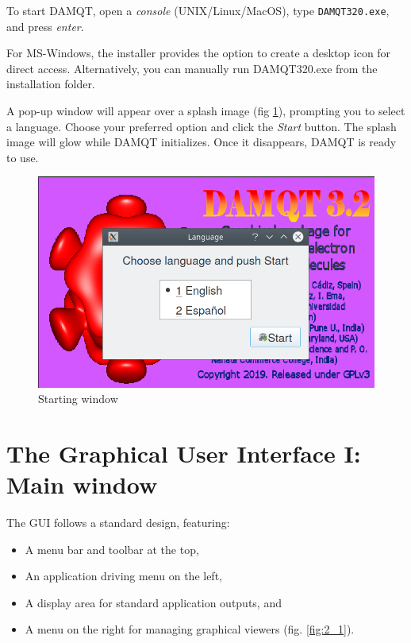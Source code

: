 \documentclass[10pt]{article}
\begin{document}
\begin{minipage}{.65\linewidth}

To start DAMQT, open a {\it console} (UNIX/Linux/MacOS), type \texttt{DAMQT320.exe}, and press {\it enter}.

For MS-Windows, the installer provides the option to create a desktop icon for direct access.
Alternatively, you can manually run DAMQT320.exe from the installation folder.

A pop-up window will appear over a splash image (fig \ref{fig:1_3_1}),
prompting you to select a language. Choose your preferred option and click the {\it Start} button.
The splash image will glow while DAMQT initializes. Once it disappears, DAMQT is ready to use.

\end{minipage}
\begin{minipage}{.38\linewidth}
\vspace*{-8mm}
\begin{figure}[H]
\begin{center}
\includegraphics[width=.83\linewidth]{damqt320_splash.png}
\end{center}
\caption{{Starting window}\label{fig:1_3_1}}
\end{figure}
\end{minipage}

\newpage

\section{The Graphical User Interface I: Main window \label{sec:2}}

The GUI follows a standard design, featuring:

\begin{itemize}
\item A menu bar and toolbar at the top,
\item An application driving menu on the left,
\item A display area for standard application outputs, and
\item A menu on the right for managing graphical viewers (fig. \ref{fig:2_1}).
\end{itemize}
\end{document}
